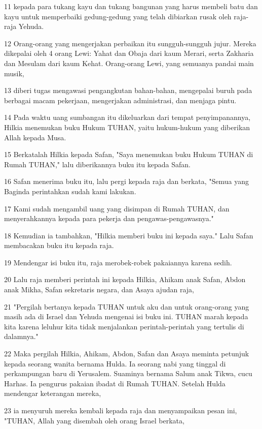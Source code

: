 \par 11 kepada para tukang kayu dan tukang bangunan yang harus membeli batu dan kayu untuk memperbaiki gedung-gedung yang telah dibiarkan rusak oleh raja-raja Yehuda.
\par 12 Orang-orang yang mengerjakan perbaikan itu sungguh-sungguh jujur. Mereka dikepalai oleh 4 orang Lewi: Yahat dan Obaja dari kaum Merari, serta Zakharia dan Mesulam dari kaum Kehat. Orang-orang Lewi, yang semuanya pandai main musik,
\par 13 diberi tugas mengawasi pengangkutan bahan-bahan, mengepalai buruh pada berbagai macam pekerjaan, mengerjakan administrasi, dan menjaga pintu.
\par 14 Pada waktu uang sumbangan itu dikeluarkan dari tempat penyimpanannya, Hilkia menemukan buku Hukum TUHAN, yaitu hukum-hukum yang diberikan Allah kepada Musa.
\par 15 Berkatalah Hilkia kepada Safan, "Saya menemukan buku Hukum TUHAN di Rumah TUHAN," lalu diberikannya buku itu kepada Safan.
\par 16 Safan menerima buku itu, lalu pergi kepada raja dan berkata, "Semua yang Baginda perintahkan sudah kami lakukan.
\par 17 Kami sudah mengambil uang yang disimpan di Rumah TUHAN, dan menyerahkannya kepada para pekerja dan pengawas-pengawasnya."
\par 18 Kemudian ia tambahkan, "Hilkia memberi buku ini kepada saya." Lalu Safan membacakan buku itu kepada raja.
\par 19 Mendengar isi buku itu, raja merobek-robek pakaiannya karena sedih.
\par 20 Lalu raja memberi perintah ini kepada Hilkia, Ahikam anak Safan, Abdon anak Mikha, Safan sekretaris negara, dan Asaya ajudan raja,
\par 21 "Pergilah bertanya kepada TUHAN untuk aku dan untuk orang-orang yang masih ada di Israel dan Yehuda mengenai isi buku ini. TUHAN marah kepada kita karena leluhur kita tidak menjalankan perintah-perintah yang tertulis di dalamnya."
\par 22 Maka pergilah Hilkia, Ahikam, Abdon, Safan dan Asaya meminta petunjuk kepada seorang wanita bernama Hulda. Ia seorang nabi yang tinggal di perkampungan baru di Yerusalem. Suaminya bernama Salum anak Tikwa, cucu Harhas. Ia pengurus pakaian ibadat di Rumah TUHAN. Setelah Hulda mendengar keterangan mereka,
\par 23 ia menyuruh mereka kembali kepada raja dan menyampaikan pesan ini, "TUHAN, Allah yang disembah oleh orang Israel berkata,
